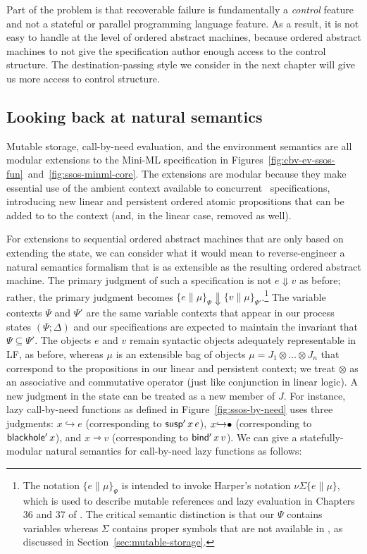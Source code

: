 Part of the problem is that recoverable failure is fundamentally a
{\it control} feature and not a stateful or parallel programming
language feature. As a result, it is not easy to handle at the level
of ordered abstract machines, because ordered abstract machines to not
give the specification author enough access to the control
structure. The destination-passing style we consider in the next
chapter will give us more access to control structure.


\subsection{Looking back at natural semantics}
\label{sec:enriching-natsem}

Mutable storage, call-by-need evaluation, and the environment
semantics are all modular extensions to the Mini-ML specification in
Figures~\ref{fig:cbv-ev-ssos-fun}~and~\ref{fig:ssos-minml-core}.  The
extensions are modular because they make essential use of the ambient
context available to concurrent \sls~specifications, introducing new
linear and persistent ordered atomic propositions that can be added to
to the context (and, in the linear case, removed as well).

For extensions to sequential ordered abstract machines that are only
based on extending the state, we can consider what it would mean to
reverse-engineer a natural semantics formalism that is as extensible
as the resulting ordered abstract machine. The primary judgment of
such a specification is not $e \Downarrow v$ as before; rather, the
primary judgment becomes $\{ e \| \mu \}_\Psi \Downarrow \{ v \| \mu
\}_{\Psi'}$.\footnote{The notation $\{ e \| \mu \}_\Psi$ is intended
  to invoke Harper's notation $\nu \Sigma \{ e \| \mu \}$, which is
  used to describe mutable references and lazy evaluation in Chapters
  36 and 37 of \cite{harper12practical}. The critical semantic
  distinction is that our $\Psi$ contains variables whereas $\Sigma$
  contains proper symbols that are not available in \sls, as discussed
  in Section~\ref{sec:mutable-storage}.} The variable contexts $\Psi$
and $\Psi'$ are the same variable contexts that appear in our process
states $(\Psi; \Delta)$ and our specifications are expected to
maintain the invariant that $\Psi \subseteq \Psi'$. The objects $e$
and $v$ remain syntactic objects adequately representable in LF, as
before, whereas $\mu$ is an extensible bag of objects $\mu = J_1
\otimes \ldots \otimes J_n$ that correspond to the propositions in our
linear and persistent context; we treat $\otimes$ as an associative
and commutative operator (just like conjunction in linear logic).  A
new judgment in the state can be treated as a new member of $J$.  For
instance, lazy call-by-need functions as defined in
Figure~\ref{fig:ssos-by-need} uses three judgments:
$x{\hookrightarrow}e$ (corresponding to ${\sf susp'}\,x\,e$),
$x{\hookrightarrow}{\mathbin{\bullet}}$ (corresponding to ${\sf blackhole'}\,x$),
and $x{\rightarrowtriangle}v$ (corresponding to ${\sf bind'}\,x\,v$).
We can give a statefully-modular natural semantics for call-by-need
lazy functions as follows:

